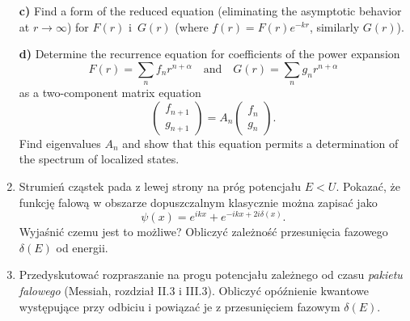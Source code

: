 \documentclass[a4paper,11pt]{article}
\begin{document}
\begin{enumerate}
  \textbf{c)} Find a form of the reduced equation (eliminating the
  asymptotic behavior at $r \to \infty$) for $F( r )$ i~$G( r )$
  (where $f( r ) = F( r ) e^{ -kr }$, similarly $G( r )$).

  \textbf{d)} Determine the recurrence equation for coefficients of
  the power expansion
  \begin{equation}
    \label{QM:24}
    F( r ) = \sum_{ n } f_{ n } r^{ n + \alpha } \quad \textrm{and} \quad
    G( r ) = \sum_{ n } g_{ n } r^{ n + \alpha }
  \end{equation}
  as a two-component matrix equation
  \begin{equation}
    \label{QM:25}
    \begin{pmatrix}
      f_{ n + 1 } \\
      g_{ n + 1 }
    \end{pmatrix}
    =
    A_{ n }
    \begin{pmatrix}
      f_{ n } \\
      g_{ n }
    \end{pmatrix}.
  \end{equation}
  Find eigenvalues $A_{ n }$ and show that this equation permits a
  determination of the spectrum of localized states.



\item Strumień cząstek pada z lewej strony na próg potencjału $E < U$.
  Pokazać, że funkcję falową w obszarze dopuszczalnym klasycznie można
  zapisać jako
  \begin{equation}
    \label{QM:26}
    \psi( x ) = e^{ ikx } + e^{ -ikx + 2 i \delta( x ) }.
  \end{equation}
  Wyjaśnić czemu jest to możliwe? Obliczyć zależność przesunięcia
  fazowego $\delta( E )$ od energii.



\item Przedyskutować rozpraszanie na progu potencjału zależnego od
  czasu \textit{pakietu falowego} (Messiah, rozdział II.3 i III.3).
  Obliczyć opóźnienie kwantowe występujące przy odbiciu i powiązać je
  z przesunięciem fazowym $\delta( E )$.




\end{enumerate}
\end{document}
